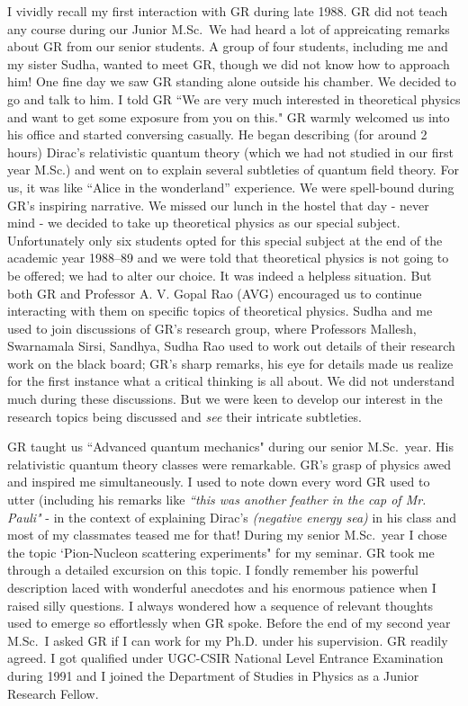 I vividly recall my first interaction with GR during late 1988. GR did not teach any course during our Junior M.Sc.\ We had heard a lot of appreicating remarks about GR from our senior students. A group of four students, including me and my sister Sudha, wanted to meet GR, though we did not know how to approach him! One fine day we saw GR standing alone outside his chamber. We decided to go and talk to him. I told GR ``We are very much interested in theoretical physics and want to get some exposure from you on this." GR warmly welcomed us into his office and started conversing casually. He began describing (for around 2 hours) Dirac’s relativistic quantum theory (which we had not studied in our first year M.Sc.) and went on to explain several subtleties of quantum field theory. For us, it was like “Alice in the wonderland” experience. We were spell-bound during GR's inspiring narrative. We missed our lunch in the hostel that day - never mind - we decided to take up theoretical physics as our special subject. Unfortunately only six students opted for this special subject at the end of the academic year 1988--89 and we were told that theoretical physics is not going to be offered; we had to alter our choice. It was indeed a helpless situation. But both GR and Professor A. V. Gopal Rao (AVG) encouraged us to continue interacting with them on specific topics of theoretical physics. Sudha and me used to join discussions of GR's research group, where Professors Mallesh, Swarnamala Sirsi, Sandhya, Sudha Rao used to work out details of their research work on the black board; GR's sharp remarks, his eye for details made us realize for the first instance what a critical thinking is all about. We did not understand much during these discussions. But we were keen to develop our interest in the research topics being discussed and \textit{see} their intricate subtleties.
\vskip 2pt

GR taught us ``Advanced quantum mechanics" during our senior M.Sc.\ year. His relativistic quantum theory classes were remarkable. GR's grasp of physics awed and inspired me simultaneously. I used to note down every word GR used to utter (including his remarks like \textit{``this was another feather in the cap of Mr. Pauli"} - in the context of explaining Dirac's \textit{(negative energy sea)} in his class and most of my classmates teased me for that! During my senior M.Sc.\ year I chose the topic `Pion-Nucleon scattering experiments" for my seminar. GR took me through a detailed excursion on this topic. I fondly remember his powerful description laced with wonderful anecdotes and his enormous patience when I raised silly questions. I always wondered how a sequence of relevant thoughts used to emerge so effortlessly when GR spoke. Before the end of my second year M.Sc.\ I asked GR if I can work for my Ph.D. under his supervision. GR readily agreed. I got qualified under UGC-CSIR National Level Entrance Examination during 1991 and I joined the Department of Studies in Physics as a Junior Research Fellow.
\vskip 2pt

